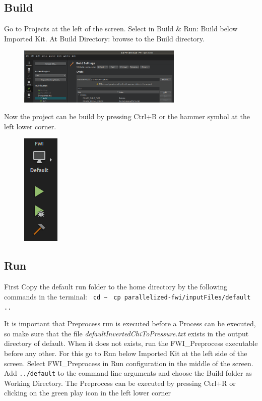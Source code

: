 \documentclass[10pt]{article}
\begin{document}
\subsection{Build}
Go to Projects at the left of the screen. Select in Build \& Run: Build below Imported Kit. At Build Directory: browse to the Build directory.
\begin{figure}[h!]
\includegraphics[width = 0.7\textwidth]{DocumentationQT_SetUpBuild}
\end{figure}
Now the project can be build by pressing Ctrl+B or the hammer symbol at the left lower corner.

\begin{figure}[h!]
\includegraphics[height = 0.3\textwidth]{DocumentationQT_RunIcons}
\end{figure}

\subsection{Run}
First Copy the default run folder to the home directory by the following commands in the terminal:
\newline
\texttt{ cd \~}
\newline
\texttt{ cp parallelized-fwi/inputFiles/default ..}
\newline

It is important that Preprocess run is executed before a Process can be executed, so make sure that the file \textit{defaultInvertedChiToPressure.txt} exists in the output directory of default. When it does not exists, run the FWI\_Preprocess executable before any other. 
\newline
For this go to Run below Imported Kit at the left side of the screen. Select FWI\_Preprocess in Run configuration in the middle of the screen. Add \texttt{../default} to the command line arguments and choose the Build folder as Working Directory.
The Preprocess can be executed by pressing Ctrl+R or clicking on the green play icon in the left lower corner
\newline
\end{document}

